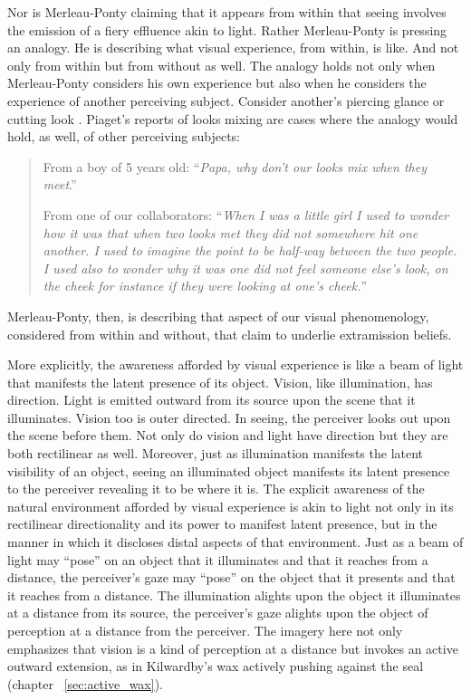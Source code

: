 Nor is Merleau-Ponty claiming that it appears from within that seeing involves the emission of a fiery effluence akin to light. Rather Merleau-Ponty is pressing an analogy. He is describing what visual experience, from within, is like. And not only from within but from without as well. The analogy holds not only when Merleau-Ponty considers his own experience but also when he considers the experience of another perceiving subject. Consider another's piercing glance or cutting look \citep[140]{Winer:1996as}. Piaget's reports of looks mixing are cases where the analogy would hold, as well, of other perceiving subjects: 
\begin{quotation}
	From a boy of 5 years old: ``\emph{Papa, why don't our looks mix when they meet}.''
	
	From one of our collaborators: ``\emph{When I was a little girl I used to wonder how it was that when two looks met they did not somewhere hit one another. I used to imagine the point to be half-way between the two people. I used also to wonder why it was one did not feel someone else's look, on the cheek for instance if they were looking at one's cheek.}'' \citep[48]{Piaget:1929dp}
\end{quotation}
Merleau-Ponty, then, is describing that aspect of our visual phenomenology, considered from within and without, that \citet{Winer:1996as} claim to underlie extramission beliefs. 

More explicitly, the awareness afforded by visual experience is like a beam of light that manifests the latent presence of its object. Vision, like illumination, has direction. Light is emitted outward from its source upon the scene that it illuminates.  Vision too is outer directed. In seeing, the perceiver looks out upon the scene before them. Not only do vision and light have direction but they are both rectilinear as well. Moreover, just as illumination manifests the latent visibility of an object, seeing an illuminated object manifests its latent presence to the perceiver revealing it to be where it is. The explicit awareness of the natural environment afforded by visual experience is akin to light not only in its rectilinear directionality and its power to manifest latent presence, but in the manner in which it discloses distal aspects of that environment. Just as a beam of light may ``pose'' on an object that it illuminates and that it reaches from a distance, the perceiver's gaze may ``pose'' on the object that it presents and that it reaches from a distance. The illumination alights upon the object it illuminates at a distance from its source, the perceiver's gaze alights upon the object of perception at a distance from the perceiver. The imagery here not only emphasizes that vision is a kind of perception at a distance but invokes an active outward extension, as in Kilwardby's wax actively pushing against the seal (chapter ~\ref{sec:active_wax}).

